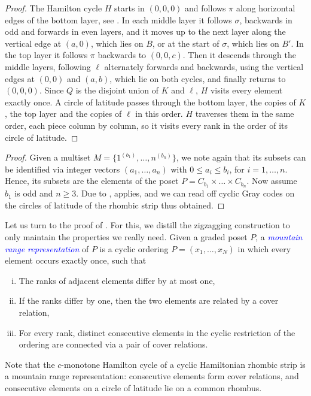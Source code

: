 \documentclass[fontsize=11pt,a4paper,DIV=12]{scrartcl}
\newcommand{\defn}[1]{\textsl{\textcolor{Blue}{#1}}}
\begin{document}
\begin{proof}
	The Hamilton cycle $H$ starts in $(0,0,0)$ and follows $\pi$ along horizontal edges of the bottom layer, see . In each middle layer it follows $\sigma$, backwards in odd and forwards in even layers, and it moves up to the next layer along the vertical edge at $(a,0)$, which lies on $B$, or at the start of $\sigma$, which lies on $B'$. In the top layer it follows $\pi$ backwards to $(0,0,c)$. Then it descends through the middle layers, following $\ell$ alternately forwards and backwards, using the vertical edges at $(0,0)$ and $(a,b)$, which lie on both cycles, and finally returns to $(0,0,0)$. Since $Q$ is the disjoint union of $K$ and $\ell$, $H$ visits every element exactly once. A circle of latitude passes through the bottom layer, the copies of $K$, the top layer and the copies of $\ell$ in this order. $H$ traverses them in the same order, each piece column by column, so it visits every rank in the order of its circle of latitude.
\end{proof}

\multisetcombinationsRS*
\begin{proof}
	Given a multiset $M=\{1^{(b_1)},\ldots,n^{(b_n)}\}$, we note again that its subsets can be identified via integer vectors $(a_1,\ldots,a_n)$ with
	$0\le a_i\le b_i$, for $i=1,\ldots,n$. Hence, its subsets are the elements of the poset $P=C_{b_1}\times\ldots\times C_{b_n}$. Now assume $b_1$ is odd and $n\ge 3$. Due to ,  applies, and we can read off cyclic Gray codes on the circles of latitude of the rhombic strip thus obtained.
\end{proof}

Let us turn to the proof of . For this, we distill the zigzagging construction to only maintain the properties we
really need. Given a graded poset $P$, a \defn{mountain range representation} of $P$ is a cyclic
ordering $P=(x_1,\ldots,x_N)$ in which every element occurs exactly once, such
that
\begin{enumerate}[(i)]
	\item The ranks of adjacent elements differ by at most one,
	\item If the ranks differ by one, then the two elements are related by a cover relation,
	      \item For every rank, distinct consecutive elements in the cyclic restriction of the ordering are connected via a pair of cover relations.
\end{enumerate}
Note that the $c$-monotone Hamilton cycle of a cyclic Hamiltonian rhombic strip is a mountain range representation: consecutive elements form cover relations, and consecutive elements on a circle of latitude lie on a common rhombus.
\end{document}
